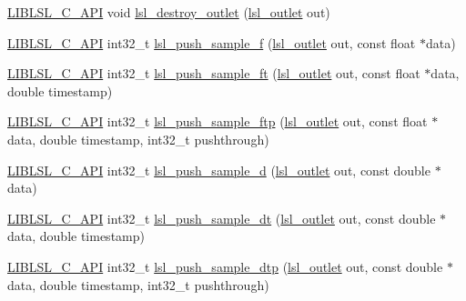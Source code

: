 \begin{DoxyCompactItemize}
\item 
\hyperlink{lsl__cpp_8h_aafd0ef1813e8be84a1420c4f1df64615}{L\+I\+B\+L\+S\+L\+\_\+\+C\+\_\+\+A\+PI} void \hyperlink{namespacelsl_aa39980eac53711feece8bfc3b50d2b24}{lsl\+\_\+destroy\+\_\+outlet} (\hyperlink{namespacelsl_abcf512b0f66dacf86c10b165995fd50b}{lsl\+\_\+outlet} out)
\item 
\hyperlink{lsl__cpp_8h_aafd0ef1813e8be84a1420c4f1df64615}{L\+I\+B\+L\+S\+L\+\_\+\+C\+\_\+\+A\+PI} int32\+\_\+t \hyperlink{namespacelsl_a001aa3637915875c44c379c07c55fb3a}{lsl\+\_\+push\+\_\+sample\+\_\+f} (\hyperlink{namespacelsl_abcf512b0f66dacf86c10b165995fd50b}{lsl\+\_\+outlet} out, const float $\ast$data)
\item 
\hyperlink{lsl__cpp_8h_aafd0ef1813e8be84a1420c4f1df64615}{L\+I\+B\+L\+S\+L\+\_\+\+C\+\_\+\+A\+PI} int32\+\_\+t \hyperlink{namespacelsl_ade95641430ee28ac2bbcf888f572d34f}{lsl\+\_\+push\+\_\+sample\+\_\+ft} (\hyperlink{namespacelsl_abcf512b0f66dacf86c10b165995fd50b}{lsl\+\_\+outlet} out, const float $\ast$data, double timestamp)
\item 
\hyperlink{lsl__cpp_8h_aafd0ef1813e8be84a1420c4f1df64615}{L\+I\+B\+L\+S\+L\+\_\+\+C\+\_\+\+A\+PI} int32\+\_\+t \hyperlink{namespacelsl_a6434485fd96e3260939bfe6fea2b317e}{lsl\+\_\+push\+\_\+sample\+\_\+ftp} (\hyperlink{namespacelsl_abcf512b0f66dacf86c10b165995fd50b}{lsl\+\_\+outlet} out, const float $\ast$data, double timestamp, int32\+\_\+t pushthrough)
\item 
\hyperlink{lsl__cpp_8h_aafd0ef1813e8be84a1420c4f1df64615}{L\+I\+B\+L\+S\+L\+\_\+\+C\+\_\+\+A\+PI} int32\+\_\+t \hyperlink{namespacelsl_ac7d63bbdbdd3b0ec26d49b22b5858d8e}{lsl\+\_\+push\+\_\+sample\+\_\+d} (\hyperlink{namespacelsl_abcf512b0f66dacf86c10b165995fd50b}{lsl\+\_\+outlet} out, const double $\ast$data)
\item 
\hyperlink{lsl__cpp_8h_aafd0ef1813e8be84a1420c4f1df64615}{L\+I\+B\+L\+S\+L\+\_\+\+C\+\_\+\+A\+PI} int32\+\_\+t \hyperlink{namespacelsl_a6877d8a4ebbe802a123a09505a106f3f}{lsl\+\_\+push\+\_\+sample\+\_\+dt} (\hyperlink{namespacelsl_abcf512b0f66dacf86c10b165995fd50b}{lsl\+\_\+outlet} out, const double $\ast$data, double timestamp)
\item 
\hyperlink{lsl__cpp_8h_aafd0ef1813e8be84a1420c4f1df64615}{L\+I\+B\+L\+S\+L\+\_\+\+C\+\_\+\+A\+PI} int32\+\_\+t \hyperlink{namespacelsl_aa6064248da7a261b46185ec9ffd12ba3}{lsl\+\_\+push\+\_\+sample\+\_\+dtp} (\hyperlink{namespacelsl_abcf512b0f66dacf86c10b165995fd50b}{lsl\+\_\+outlet} out, const double $\ast$data, double timestamp, int32\+\_\+t pushthrough)
\item 

\end{DoxyCompactItemize}
